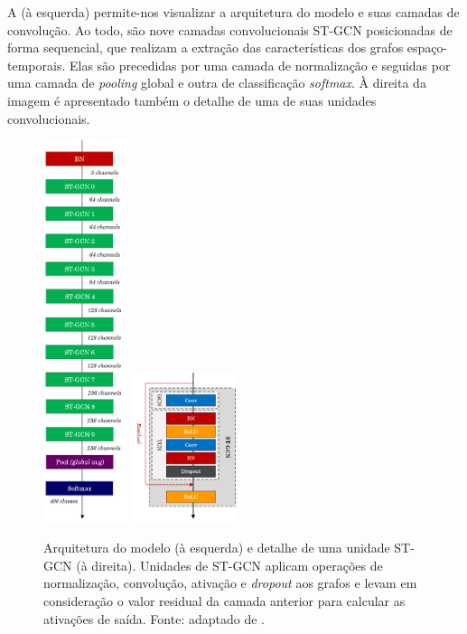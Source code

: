 
A  (à esquerda) permite-nos visualizar a arquitetura do modelo e suas camadas de convolução. Ao todo, são nove camadas convolucionais ST-GCN posicionadas de forma sequencial, que realizam a extração das características dos grafos espaço-temporais. Elas são precedidas por uma camada de normalização e seguidas por uma camada de \textit{pooling} global e outra de classificação \textit{softmax}. À direita da imagem é apresentado também o detalhe de uma de suas unidades convolucionais.

\begin{figure}[ht]
    \centering
    \includegraphics[width=2.5cm]{images/st_gcn_architecture}
    \includegraphics[width=3.0cm]{images/st_gcn_architeture_unit}
    \caption{Arquitetura do modelo (à esquerda) e detalhe de uma unidade ST-GCN (à direita). Unidades de ST-GCN aplicam operações de normalização, convolução, ativação e \textit{dropout} aos grafos e levam em consideração o valor residual da camada anterior para calcular as ativações de saída. Fonte: adaptado de \cite{st-gcn-2018}.}
    \label{fig:st-gcn-architecture}
\end{figure}


